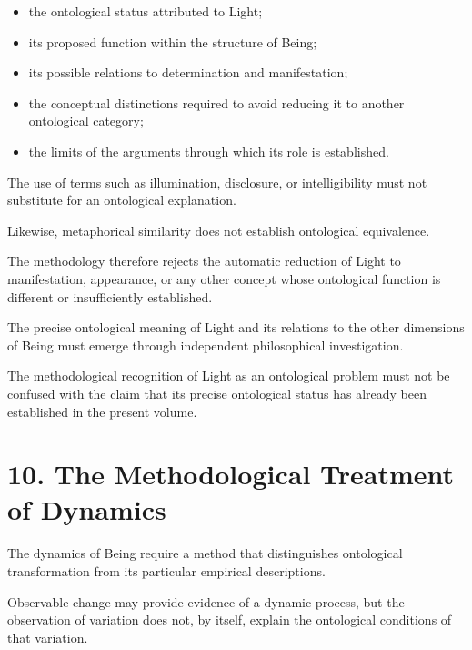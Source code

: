 \begin{itemize}

    \item the ontological status
    attributed to Light;

    \item its proposed function
    within the structure of Being;

    \item its possible relations
    to determination and manifestation;

    \item the conceptual distinctions
    required to avoid reducing
    it to another ontological
    category;

    \item the limits of the arguments
    through which its role is
    established.

\end{itemize}

The use of terms such as illumination,
disclosure, or intelligibility must
not substitute for an ontological
explanation.

Likewise, metaphorical similarity
does not establish ontological
equivalence.

The methodology therefore rejects
the automatic reduction of Light
to manifestation, appearance,
or any other concept whose
ontological function is different
or insufficiently established.

The precise ontological meaning
of Light and its relations to
the other dimensions of Being
must emerge through independent
philosophical investigation.

The methodological recognition
of Light as an ontological problem
must not be confused with the
claim that its precise ontological
status has already been established
in the present volume.


\section*{10. The Methodological Treatment of Dynamics}

The dynamics of Being require
a method that distinguishes
ontological transformation from
its particular empirical descriptions.

Observable change may provide
evidence of a dynamic process,
but the observation of variation
does not, by itself, explain
the ontological conditions
of that variation.

